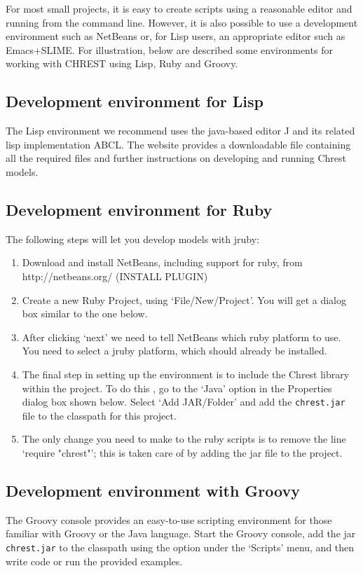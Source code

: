 \documentclass{article}
\begin{document}

For most small projects, it is easy to create scripts using a reasonable editor
and running from the command line.  However, it is also possible to use a
development environment such as NetBeans or, for Lisp users, an appropriate
editor such as Emacs+SLIME.  For illustration, below are described some
environments for working with CHREST using Lisp, Ruby and Groovy.

\subsection{Development environment for Lisp}

The Lisp environment we recommend uses the java-based editor J and its related
lisp implementation ABCL.  The website provides a downloadable file containing
all the required files and further instructions on developing and running
Chrest models.

\subsection{Development environment for Ruby}

The following steps will let you develop models with jruby:

\begin{enumerate}
\item Download and install NetBeans, including support for ruby, from
http://netbeans.org/  (INSTALL PLUGIN)
\item Create a new Ruby Project, using `File/New/Project'.  You will get a
dialog box similar to the one below.
\item After clicking `next' we need to tell NetBeans which ruby platform to
use.  You need to select a jruby platform, which should already be installed.
\item The final step in setting up the environment is to include the Chrest
library within the project. To do this , go to the `Java' option in the
Properties dialog box shown below. Select `Add JAR/Folder' and add the
{\tt chrest.jar} file to the classpath for this project. 
\item The only change you need to make to the ruby scripts is to remove the
line `require "chrest"'; this is taken care of by adding the jar file to the
project.
\end{enumerate}

\subsection{Development environment with Groovy}

The Groovy console provides an easy-to-use scripting environment for those
familiar with Groovy or the Java language.  Start the Groovy console, 
add the jar {\tt chrest.jar} to the classpath using the option under the `Scripts' 
menu, and then write code or run the provided examples.
\end{document}
